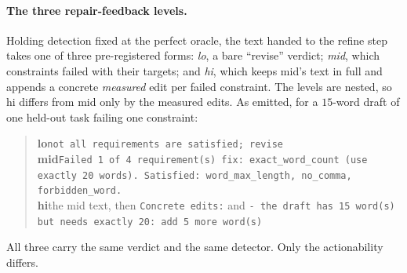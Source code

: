 \documentclass[11pt]{article}
\begin{document}
\paragraph{The three repair-feedback levels.}
Holding detection fixed at the perfect oracle, the text handed to the refine step takes one of
three pre-registered forms: \emph{lo}, a bare ``revise'' verdict; \emph{mid}, which constraints
failed with their targets; and \emph{hi}, which keeps mid's text in full and appends a concrete
\emph{measured} edit per failed constraint. The levels are nested, so hi differs from mid only by
the measured edits. As emitted, for a $15$-word draft of one held-out task failing one constraint:
\begin{quote}\small
\textbf{lo}\quad \texttt{not all requirements are satisfied; revise}\\
\textbf{mid}\quad \texttt{Failed 1 of 4 requirement(s) \textemdash{} fix: exact\_word\_count (use
exactly 20 words). Satisfied: word\_max\_length, no\_comma, forbidden\_word.}\\
\textbf{hi}\quad the mid text, then \texttt{Concrete edits:} and \texttt{- the draft has 15
word(s) but needs exactly 20: add 5 more word(s)}
\end{quote}
All three carry the same verdict and the same detector. Only the actionability differs.
\end{document}
